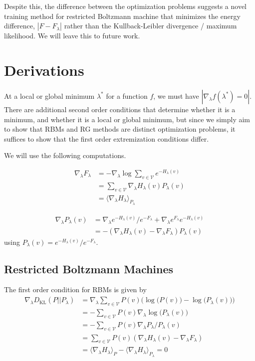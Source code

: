 \documentclass{article}
\theoremstyle{remark}
\theoremstyle{definition}
\begin{document}
Despite this, the difference between the optimization problems suggests a novel training method for restricted Boltzmann machine that minimizes the energy difference, $|F - F_\lambda|$ rather than the Kullback-Leibler divergence / maximum likelihood. We will leave this to future work.

\section*{Derivations}

At a local or global minimum $\lambda^*$ for a function $f$, we must have $|\nabla_\lambda f(\lambda^*) = 0|$. There are additional second order conditions that determine whether it is a minimum, and whether it is a local or global minimum, but since we simply aim to show that RBMs and RG methods are distinct optimization problems, it suffices to show that the first order extremization conditions differ.

We will use the following computations.

\begin{align}\label{eq:df}
    \nabla_\lambda F_\lambda &= - \nabla_\lambda \log \sum_{v \in \mathcal V} e^{-H_\lambda(v)} \\
    &= \sum_{v \in \mathcal V} \nabla_\lambda H_\lambda(v) P_\lambda(v) \\
    &= \langle \nabla_\lambda H_\lambda \rangle_{P_\lambda}
\end{align}

\begin{align}
    \nabla_\lambda P_\lambda(v) &= \nabla_\lambda e^{-H_\lambda(v)} / e^{-F_\lambda} + \nabla_\lambda e^{F_\lambda} e^{-H_\lambda(v)} \\
    &= -(\nabla_\lambda H_\lambda(v) - \nabla_\lambda F_\lambda) P_\lambda(v)
\end{align}
using $P_\lambda(v) = e^{-H_\lambda(v)}/e^{-F_\lambda}$.

\subsection*{Restricted Boltzmann Machines}

The first order condition for RBMs is given by
\begin{align}
    \nabla_\lambda D_\text{KL}(P || P_\lambda) &= \nabla_\lambda \sum_{v \in \mathcal V} P(v) \bigg( \log\big(P(v)\big) - \log\big( P_\lambda(v) \big)\bigg) \\
    &= - \sum_{v \in \mathcal V} P(v) \nabla_\lambda \log\big( P_\lambda(v) \big) \\
    &= - \sum_{v \in \mathcal V} P(v) \nabla_\lambda P_\lambda / P_\lambda(v) \\ 
    &= \sum_{v \in \mathcal V} P(v) (\nabla_\lambda H_\lambda(v) - \nabla_\lambda F_\lambda) \\
    &= \langle \nabla_\lambda H_\lambda \rangle_P - \langle \nabla_\lambda H_\lambda \rangle_{P_\lambda} = 0
\end{align}
\end{document}
